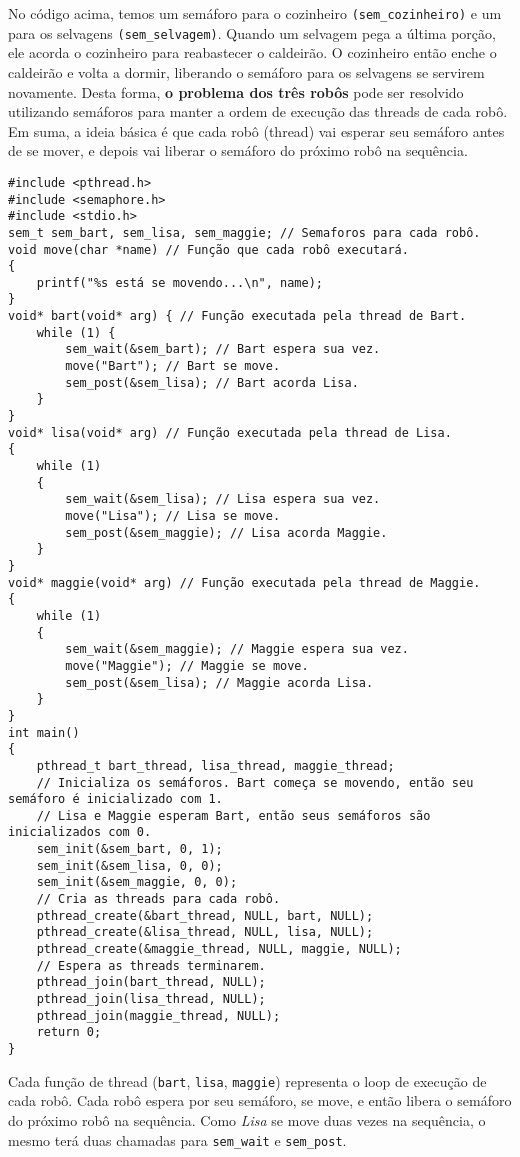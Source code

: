 \documentclass[12pt]{article}
\begin{document}
No código acima, temos um semáforo para o cozinheiro \verb|(sem_cozinheiro)|
e um para os selvagens \verb|(sem_selvagem)|. Quando um selvagem pega a
última porção, ele acorda o cozinheiro para reabastecer o caldeirão.
O cozinheiro então enche o caldeirão e volta a dormir, liberando o semáforo para os selvagens se servirem novamente.
Desta forma, \textbf{o problema dos três robôs} pode ser resolvido utilizando
semáforos para manter a ordem de execução das threads de cada robô.
Em suma, a ideia básica é que cada robô (thread) vai esperar seu semáforo
antes de se mover, e depois vai liberar o semáforo do próximo robô na sequência.
\begin{lstlisting}[caption=Problema dos três robôs]
#include <pthread.h>
#include <semaphore.h>
#include <stdio.h>
sem_t sem_bart, sem_lisa, sem_maggie; // Semaforos para cada robô.
void move(char *name) // Função que cada robô executará.
{
    printf("%s está se movendo...\n", name);
}
void* bart(void* arg) { // Função executada pela thread de Bart.
    while (1) {
        sem_wait(&sem_bart); // Bart espera sua vez.
        move("Bart"); // Bart se move.
        sem_post(&sem_lisa); // Bart acorda Lisa.
    }
}
void* lisa(void* arg) // Função executada pela thread de Lisa.
{
    while (1)
    {
        sem_wait(&sem_lisa); // Lisa espera sua vez.
        move("Lisa"); // Lisa se move.
        sem_post(&sem_maggie); // Lisa acorda Maggie.
    }
}
void* maggie(void* arg) // Função executada pela thread de Maggie.
{
    while (1)
    {
        sem_wait(&sem_maggie); // Maggie espera sua vez.
        move("Maggie"); // Maggie se move.
        sem_post(&sem_lisa); // Maggie acorda Lisa.
    }
}
int main()
{
    pthread_t bart_thread, lisa_thread, maggie_thread;
    // Inicializa os semáforos. Bart começa se movendo, então seu semáforo é inicializado com 1.
    // Lisa e Maggie esperam Bart, então seus semáforos são inicializados com 0.
    sem_init(&sem_bart, 0, 1);
    sem_init(&sem_lisa, 0, 0);
    sem_init(&sem_maggie, 0, 0);
    // Cria as threads para cada robô.
    pthread_create(&bart_thread, NULL, bart, NULL);
    pthread_create(&lisa_thread, NULL, lisa, NULL);
    pthread_create(&maggie_thread, NULL, maggie, NULL);
    // Espera as threads terminarem.
    pthread_join(bart_thread, NULL);
    pthread_join(lisa_thread, NULL);
    pthread_join(maggie_thread, NULL);
    return 0;
}
\end{lstlisting}
Cada função de thread (\verb|bart|, \verb|lisa|, \verb|maggie|)
representa o loop de execução de cada robô. Cada robô
espera por seu semáforo, se move, e então libera o semáforo
do próximo robô na sequência. Como \textit{Lisa} se move duas vezes na sequência, o mesmo terá duas chamadas para \verb|sem_wait| e \verb|sem_post|.
\end{document}
